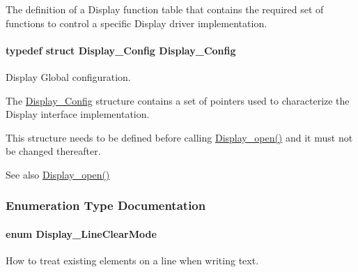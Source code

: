 The definition of a Display function table that contains the required set of functions to control a specific Display driver implementation. 

\paragraph[{Display\+\_\+\+Config}]{\setlength{\rightskip}{0pt plus 5cm}typedef struct {\bf Display\+\_\+\+Config}  {\bf Display\+\_\+\+Config}}\label{_display_8h_a154de9b84d3b0d30daa9d729d65a6d5c}


Display Global configuration. 

The \hyperlink{struct_display___config}{Display\+\_\+\+Config} structure contains a set of pointers used to characterize the Display interface implementation.

This structure needs to be defined before calling \hyperlink{_display_8h_a3aa87973a354d4fd6a2969f764e8afe6}{Display\+\_\+open()} and it must not be changed thereafter.

\begin{DoxySeeAlso}{See also}
\hyperlink{_display_8h_a3aa87973a354d4fd6a2969f764e8afe6}{Display\+\_\+open()} 
\end{DoxySeeAlso}


\subsubsection{Enumeration Type Documentation}
\paragraph[{Display\+\_\+\+Line\+Clear\+Mode}]{\setlength{\rightskip}{0pt plus 5cm}enum {\bf Display\+\_\+\+Line\+Clear\+Mode}}\label{_display_8h_a3d9ab99875c344491227a76f1d47e377}


How to treat existing elements on a line when writing text. 

